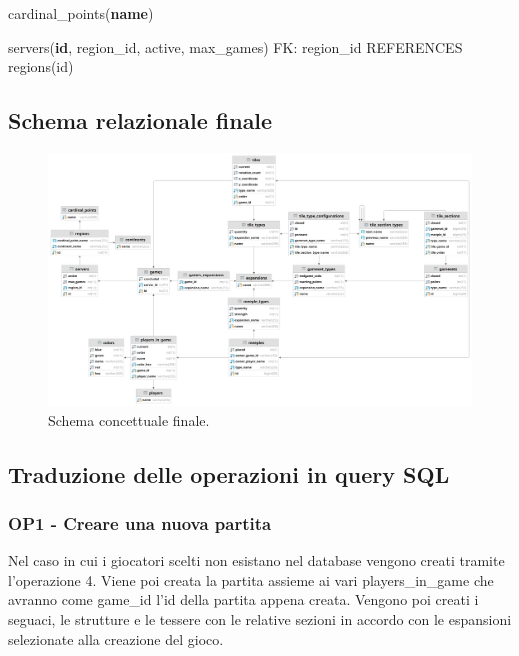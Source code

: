 cardinal\_points(\textbf{name})\newline

servers(\textbf{id}, region\_id, active, max\_games)\newline
FK: region\_id REFERENCES regions(id)

\subsection{Schema relazionale finale}
\begin{figure}[ht]
    \centering\includegraphics[scale=0.06]{images/Progettazione/relazionale.png}
    \caption{Schema concettuale finale.}
\end{figure}

\subsection{Traduzione delle operazioni in query SQL}
\subsubsection*{OP1 - Creare una nuova partita}
Nel caso in cui i giocatori scelti non esistano nel database vengono creati tramite l'operazione 4. Viene poi creata la partita assieme ai vari players\_in\_game che avranno come game\_id l'id della partita appena creata. Vengono poi creati i seguaci, le strutture e le tessere con le relative sezioni in accordo con le espansioni selezionate alla creazione del gioco.
\medskip


